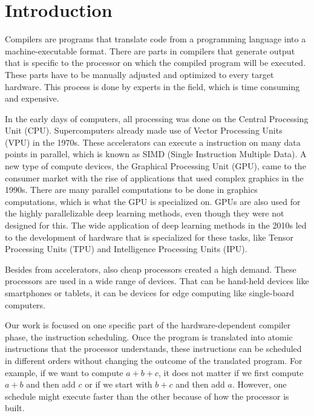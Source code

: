 \chapter{Introduction}
Compilers are programs that translate code from a programming language into a machine-executable format.
There are parts in compilers that generate output that is specific to the processor on which the compiled program will be executed.
These parts have to be manually adjusted and optimized to every target hardware.
This process is done by experts in the field, which is time consuming and expensive.

In the early days of computers, all processing was done on the Central Processing Unit (CPU).
Supercomputers already made use of Vector Processing Units (VPU) in the 1970s.
These accelerators can execute a instruction on many data points in parallel, which is known as SIMD (Single Instruction Multiple Data).
A new type of compute devices, the Graphical Processing Unit (GPU), came to the consumer market with the rise of applications that used complex graphics in the 1990s.
There are many parallel computations to be done in graphics computations, which is what the GPU is specialized on.
GPUs are also used for the highly parallelizable deep learning methods, even though they were not designed for this.
The wide application of deep learning methods in the 2010s led to the development of hardware that is specialized for these tasks, like Tensor Processing Units (TPU) and Intelligence Processing Units (IPU).

Besides from accelerators, also cheap processors created a high demand.
These processors are used in a wide range of devices.
That can be hand-held devices like smartphones or tablets, it can be devices for edge computing like single-board computers.

Our work is focused on one specific part of the hardware-dependent compiler phase, the instruction scheduling.
Once the program is translated into atomic instructions that the processor understands, these instructions can be scheduled in different orders without changing the outcome of the translated program.
For example, if we want to compute $a+b+c$, it does not matter if we first compute $a+b$ and then add $c$ or if we start with $b+c$ and then add $a$.
However, one schedule might execute faster than the other because of how the processor is built.

